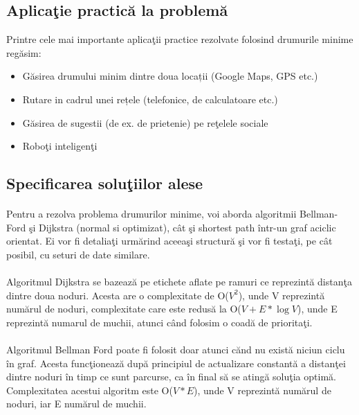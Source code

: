 \documentclass[runningheads]{llncs}
\begin{document}
\subsection{Aplica\c{t}ie practic\u{a} la problem\u{a}}
Printre cele mai importante aplica\c{t}ii practice rezolvate folosind drumurile minime reg\u{a}sim:
\begin{itemize}
	\item Găsirea drumului minim dintre doua locații (Google Maps, GPS etc.)
	\item Rutare in cadrul unei rețele (telefonice, de calculatoare etc.)
	\item G\u{a}sirea de sugestii (de ex. de prietenie) pe re\c{t}elele sociale
	\item Robo\c{t}i inteligen\c{t}i
\end{itemize}

\subsection{Specificarea solu\c{t}iilor alese}
\paragraph{}Pentru a rezolva problema drumurilor minime, voi aborda algoritmii Bellman-Ford \c{s}i Dijkstra (normal si optimizat), c\^{a}t \c{s}i shortest path \^{i}ntr-un graf aciclic orientat. Ei vor fi detalia\c{t}i urm\u{a}rind aceea\c{s}i structur\u{a} \c{s}i vor fi testa\c{t}i, pe c\^{a}t posibil, cu seturi de date similare.
\paragraph{}Algoritmul Dijkstra se bazeaz\u{a} pe etichete aflate pe ramuri ce reprezint\u{a} distan\c{t}a dintre doua noduri. Acesta are o complexitate de O($V^2$),  unde V reprezint\u{a} num\u{a}rul de noduri, complexitate care este redus\u{a} la O($V + E * \log{V}$), unde E reprezint\u{a} numarul de muchii, atunci c\^{a}nd folosim o coad\u{a} de priorita\c{t}i.

\paragraph{}Algoritmul Bellman Ford poate fi folosit doar atunci c\u{a}nd nu exist\u{a} niciun ciclu \^{i}n graf. Acesta func\c{t}ioneaz\u{a} dup\u{a} principiul de actualizare constant\u{a} a distan\c{t}ei dintre noduri \^{i}n timp ce sunt parcurse, ca \^{i}n final s\u{a} se ating\u{a} solu\c{t}ia optim\u{a}. Complexitatea acestui algoritm este O($V*E$), unde V reprezint\u{a} num\u{a}rul de noduri, iar E num\u{a}rul de muchii.
\end{document}
